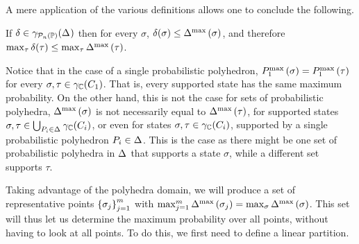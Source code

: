 A mere application of the various definitions allows one to conclude
the following.

\begin{remark} \label{rem:ppp:prob} If $ \delta \in \gamma_{\mathcal{P}_{n}\left( \mathbb{P} \right)}(\Delta_{}) $ then
for every $ \sigma $, $ \delta(\sigma) \leq \Delta_{}^{\text{max}}\left( \sigma \right)
$, and therefore $ \max_{\tau} \delta(\tau) \leq
\max_{\tau}\Delta_{}^{\text{max}}\left( \tau \right) $.
\end{remark}

Notice that in the case of a single probabilistic polyhedron, $
P_{1}^{\text{max}}\left( \sigma \right) = P_{1}^{\text{max}}\left( \tau \right) $ for every $ \sigma,
\tau \in \gamma_{\mathbb{C}}(C_{1}) $. That is, every supported state has the
same maximum probability. On the other hand, this is not the case for
sets of probabilistic polyhedra, $ \Delta_{}^{\text{max}}\left( \sigma \right) $ is not
necessarily equal to $ \Delta_{}^{\text{max}}\left( \tau \right) $, for supported states
$ \sigma, \tau \in \bigcup_{P_{i}\in\Delta_{}} \gamma_{\mathbb{C}}(C_{i}) $, or
even for states $ \sigma, \tau \in \gamma_{\mathbb{C}}(C_{i}) $, supported by
a single probabilistic polyhedron $ P_{i} \in \Delta_{} $. This is the
case as there might be one set of probabilistic polyhedra in $ \Delta_{}
$ that supports a state $ \sigma $, while a different set supports $
\tau $.

Taking advantage of the polyhedra domain, we will produce a set of
representative points $ \left\{ \sigma_j \right\}_{j=1}^{m} $ with $
\max_{j=1}^{m}\Delta_{}^{\text{max}}\left( \sigma_j \right) =
\max_{\sigma}\Delta_{}^{\text{max}}\left( \sigma \right) $. This set will thus let us
determine the maximum probability over all points, without having to
look at all points. To do this, we first need to define a linear
partition. 

